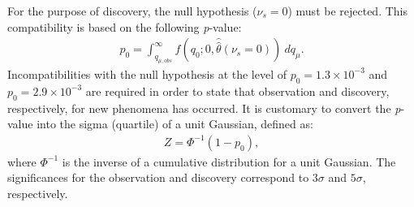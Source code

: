 For the purpose of discovery, the null hypothesis ($\nu_s = 0$) must be rejected. This compatibility is based on the following \emph{p}-value:
\begin{equation}
    \label{eq:pvalue_bonly}
    \begin{aligned}
        p_{0} = \int_{q_{\mu,obs}}^\infty f(q_0;0,\hat{\hat{\theta}}(\nu_s =0))~dq_\mu.
    \end{aligned}
\end{equation}
Incompatibilities with the null hypothesis at the level of $p_0 = 1.3 \times 10^{-3}$ and $p_0 = 2.9 \times 10^{-3}$ are required in order to state that observation and discovery, respectively, for new phenomena has occurred. It is customary to convert the \emph{p}-value into the sigma (quartile) of a unit Gaussian, defined as:
\begin{equation}
    \label{eq:sigma}
    \begin{aligned}
    Z = \Phi^{-1}(1-p_0),
    \end{aligned}
\end{equation}
where $\Phi^{-1}$ is the inverse of a cumulative distribution for a unit Gaussian. The significances for the observation and discovery correspond to $3\sigma$ and $5\sigma$, respectively.

